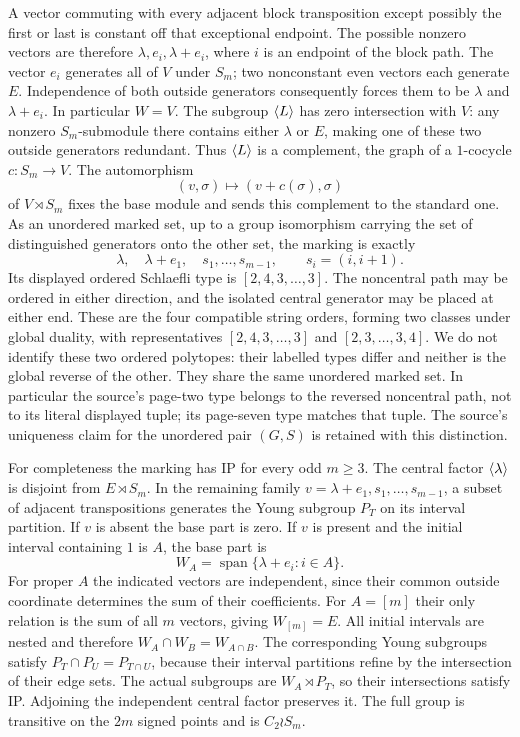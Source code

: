 A vector commuting with every adjacent block transposition except
possibly the first or last is constant off that exceptional endpoint.
The possible nonzero vectors are therefore $\lambda,e_i,\lambda+e_i$,
where $i$ is an endpoint of the block path. The vector $e_i$ generates
all of $V$ under $S_m$; two nonconstant even vectors each generate $E$.
Independence of both outside generators consequently forces them to be
$\lambda$ and $\lambda+e_i$. In particular $W=V$.
The subgroup $\langle L\rangle$ has zero intersection with $V$: any nonzero
$S_m$-submodule there contains either $\lambda$ or $E$, making one
of these two outside generators redundant. Thus $\langle L\rangle$ is a
complement, the graph of a $1$-cocycle $c:S_m\to V$. The automorphism
\[
 (v,\sigma)\longmapsto(v+c(\sigma),\sigma)
\]
of $V\rtimes S_m$ fixes the base module and sends this complement
to the standard one. As an unordered marked set, up to a group isomorphism carrying the
set of distinguished generators onto the other set, the marking is
exactly
\[
 \lambda,\quad\lambda+e_1,\quad s_1,\ldots,s_{m-1},
 \qquad s_i=(i,i+1).
\]
Its displayed ordered Schlaefli type is $[2,4,3,\ldots,3]$.
The noncentral path may be ordered in either direction, and the isolated
central generator may be placed at either end. These are the four
compatible string orders, forming two classes under global duality,
with representatives $[2,4,3,\ldots,3]$ and $[2,3,\ldots,3,4]$.
We do not identify these two ordered polytopes: their labelled types
differ and neither is the global reverse of the other. They share the
same unordered marked set. In particular the source's page-two type
belongs to the reversed noncentral path, not to its literal displayed
tuple; its page-seven type matches that tuple. The source's uniqueness
claim for the unordered pair $(G,S)$ is retained with this distinction.

For completeness the marking has IP for every odd $m\geq3$.
The central factor $\langle\lambda\rangle$ is disjoint from $E\rtimes S_m$.
In the remaining family $v=\lambda+e_1,s_1,\ldots,s_{m-1}$, a subset
of adjacent transpositions generates the Young subgroup $P_T$ on
its interval partition. If $v$ is absent the base part is zero.
If $v$ is present and the initial interval containing $1$ is $A$,
the base part is
\[
 W_A=\operatorname{span}\{\lambda+e_i:i\in A\}.
\]
For proper $A$ the indicated vectors are independent, since their
common outside coordinate determines the sum of their coefficients.
For $A=[m]$ their only relation is the sum of all $m$ vectors, giving
$W_{[m]}=E$. All initial intervals are nested and therefore
$W_A\cap W_B=W_{A\cap B}$. The corresponding Young subgroups satisfy
$P_T\cap P_U=P_{T\cap U}$, because their interval partitions refine
by the intersection of their edge sets. The actual subgroups are
$W_A\rtimes P_T$, so their intersections satisfy IP. Adjoining the
independent central factor preserves it. The full group is transitive
on the $2m$ signed points and is $C_2\wr S_m$.
